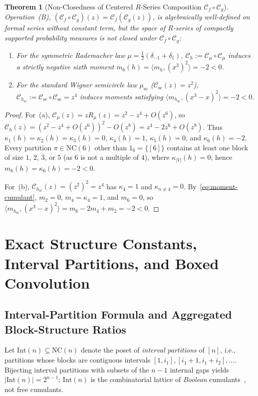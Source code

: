 \documentclass[11pt]{article}
\newtheorem{theorem}{Theorem}[section]
\theoremstyle{definition}
\newcommand{\NC}{\mathrm{NC}}
\newcommand{\IntP}{\mathrm{Int}}
\begin{document}
\begin{theorem}[Non-Closedness of Centered $R$-Series Composition $\mathcal{C}_f \circ \mathcal{C}_g$]\label{thm:opB-positivity}
Operation~(B), $(\mathcal{C}_f \circ \mathcal{C}_g)(z) = \mathcal{C}_f(\mathcal{C}_g(z))$, is algebraically well-defined on formal series without constant term, but the space of $R$-series of compactly supported probability measures is \emph{not} closed under $\mathcal{C}_f \circ \mathcal{C}_g$:
\begin{enumerate}
  \item[(a)] For the symmetric Rademacher law $\mu = \frac{1}{2}(\delta_{-1} + \delta_1)$, $\mathcal{C}_h := \mathcal{C}_\mu \circ \mathcal{C}_\mu$ induces a strictly negative sixth moment $m_6(h) = \langle m_h, (x^3)^2\rangle = -2 < 0$.
  \item[(b)] For the standard Wigner semicircle law $\mu_{\mathrm{sc}}$ ($\mathcal{C}_{\mathrm{sc}}(z) = z^2$), $\mathcal{C}_{h_{\mathrm{sc}}} := \mathcal{C}_{\mathrm{sc}} \circ \mathcal{C}_{\mathrm{sc}} = z^4$ induces moments satisfying $\langle m_{h_{\mathrm{sc}}}, (x^3 - x)^2\rangle = -2 < 0$.
\end{enumerate}
\end{theorem}
\begin{proof}
For~(a), $\mathcal{C}_\mu(z) = z R_\mu(z) = z^2 - z^4 + O(z^6)$, so $\mathcal{C}_h(z) = (z^2 - z^4 + O(z^6))^2 - O(z^8) = z^4 - 2z^6 + O(z^8)$. Thus $\kappa_1(h) = \kappa_2(h) = \kappa_3(h) = 0$, $\kappa_4(h) = 1$, $\kappa_5(h) = 0$, and $\kappa_6(h) = -2$. Every partition $\pi \in \NC(6)$ other than $1_6 = \{[6]\}$ contains at least one block of size $1$, $2$, $3$, or $5$ (as $6$ is not a multiple of $4$), where $\kappa_{|V|}(h) = 0$; hence $m_6(h) = \kappa_6(h) = -2 < 0$.

For~(b), $\mathcal{C}_{h_{\mathrm{sc}}}(z) = (z^2)^2 = z^4$ has $\kappa_4 = 1$ and $\kappa_{n \neq 4} = 0$. By~\eqref{eq:moment-cumulant}, $m_2 = 0$, $m_4 = \kappa_4 = 1$, and $m_6 = 0$, so $\langle m_{h_{\mathrm{sc}}}, (x^3 - x)^2\rangle = m_6 - 2m_4 + m_2 = -2 < 0$.
\end{proof}

\section{Exact Structure Constants, Interval Partitions, and Boxed Convolution}

\subsection{Interval-Partition Formula and Aggregated Block-Structure Ratios}
Let $\IntP(n) \subseteq \NC(n)$ denote the poset of \emph{interval partitions} of $[n]$, i.e., partitions whose blocks are contiguous intervals $[1, i_1], [i_1+1, i_1+i_2], \dots$. Bijecting interval partitions with subsets of the $n-1$ internal gaps yields $|\IntP(n)| = 2^{n-1}$; $\IntP(n)$ is the combinatorial lattice of \emph{Boolean} cumulants~\cite{SpeicherWoroudi1997}, not free cumulants.
\end{document}
